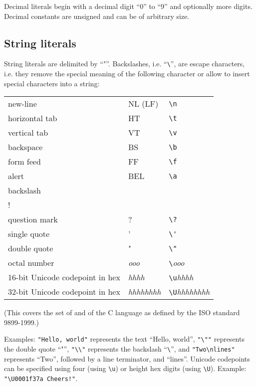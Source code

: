 Decimal literals begin with a decimal digit ``0'' to ``9'' and
optionally more digits. Decimal constants are unsigned and can
be of arbitrary size.

\subsection{String literals}

String literals are delimited by ``"''. Backslashes,
i.e. ``\lstinline!\!'',
are escape characters, i.e. they remove the special meaning of
the following character or allow to insert special characters into a
string:

\bigskip

\noindent
\begin{tabular}{| l l l |}
\hline
new-line & NL (LF) & \lstinline!\n! \\
horizontal tab & HT & \lstinline!\t! \\
vertical tab & VT & \lstinline!\v! \\
backspace & BS & \lstinline!\b! \\
form feed & FF & \lstinline!\f! \\
alert & BEL & \lstinline!\a! \\
backslash & \backslashSY{} & \lstinline!\\! \\
question mark & ? & \lstinline!\?! \\
single quote & ' & \lstinline!\'! \\
double quote & " & \lstinline!\"! \\
octal number & \textit{ooo} & \lstinline!\!\textit{ooo} \\
16-bit Unicode codepoint in hex & \textit{hhhh} & \lstinline!\u!\textit{hhhh} \\
32-bit Unicode codepoint in hex & \textit{hhhhhhhh}
   & \lstinline!\U!\textit{hhhhhhhh} \\
\hline
\end{tabular}

\bigskip

\noindent
(This covers the set of  and
 of the C language as defined
by the ISO standard 9899-1999.)

Examples: \lstinline!"Hello, world"! represents the text ``Hello, world'',
\lstinline!"\""! represents the double quote ``"'',
\lstinline!"\\"! represents the backslash ``\lstinline!\!'',
and \lstinline!"Two\nlines"! represents ``Two'', followed by
a line terminator, and ``lines''. Unicode codepoints can be
specified using four (using \lstinline!\u!) or height hex digits
(using \lstinline!\U!). Example: \lstinline^"\U0001f37a Cheers!"^.

